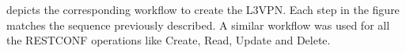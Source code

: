 \documentclass[10pt, conference]{IEEEtran}
\begin{document}
 depicts the corresponding workflow to create the L3VPN. Each step in the figure matches the sequence previously described. A similar workflow was used for all the RESTCONF operations like Create, Read, Update and Delete. 



    

\end{document}
